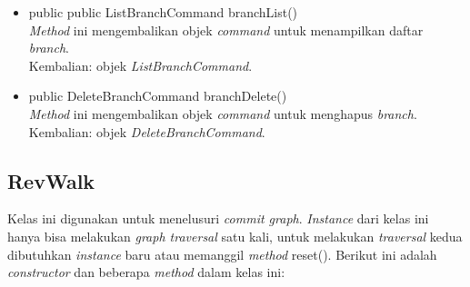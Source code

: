 \begin{itemize}
\item public public ListBranchCommand branchList()\\
\textit{Method} ini mengembalikan objek \textit{command} untuk menampilkan daftar \textit{branch}.\\
Kembalian: objek \textit{ListBranchCommand}.

\item public DeleteBranchCommand branchDelete()\\
\textit{Method} ini mengembalikan objek \textit{command} untuk menghapus \textit{branch}.\\
Kembalian: objek \textit{DeleteBranchCommand}.
\end{itemize}

\subsection{RevWalk}
\label{subsec:revwalk}
Kelas ini digunakan untuk menelusuri \textit{commit graph}. \textit{Instance} dari kelas ini hanya bisa melakukan  \textit{graph traversal} satu kali, untuk melakukan \textit{traversal} kedua dibutuhkan \textit{instance} baru atau memanggil \textit{method} reset(). Berikut ini adalah \textit{constructor} dan beberapa \textit{method} dalam kelas ini:
